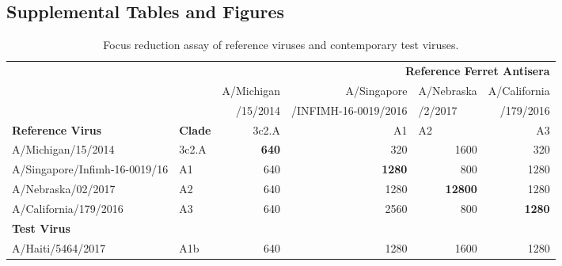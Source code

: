 \onecolumngrid
\setcounter{figure}{0}
\setcounter{table}{0}
\renewcommand{\thefigure}{S\arabic{figure}}
\renewcommand{\thetable}{S\Roman{table}}

\subsection*{Supplemental Tables and Figures}

\begin{table}[htbp]
  \centering
  \caption{Focus reduction assay of reference viruses and contemporary test viruses.}
    \begin{tabular}{|p{11em}|p{3em}|r|r|p{5em}|r|}
    \toprule
    \multicolumn{2}{c|}{\multirow{3}[3]{*}{}} & \multicolumn{4}{p{20em}|}{\textbf{Reference Ferret Antisera}} \\
\cmidrule{3-6}    \multicolumn{2}{c|}{} & \multicolumn{1}{p{5em}|}{A/Michigan} & \multicolumn{1}{p{5em}|}{A/Singapore} & A/Nebraska & \multicolumn{1}{p{5em}|}{A/California} \\
    \multicolumn{2}{c|}{} & \multicolumn{1}{p{5em}|}{/15/2014} & \multicolumn{1}{p{5em}|}{/INFIMH-16-0019/2016} & /2/2017 & \multicolumn{1}{p{5em}|}{/179/2016} \\
    \textbf{Reference Virus} & \textbf{Clade} & \multicolumn{1}{p{5em}|}{\cellcolor[rgb]{ .282,  .439,  .922}3c2.A} & \multicolumn{1}{p{5em}|}{\cellcolor[rgb]{ .459,  .776,  .663}A1} & \cellcolor[rgb]{ .996,  .733,  .263}A2 & \multicolumn{1}{p{5em}|}{\cellcolor[rgb]{ 1,  .412,  .2}A3} \\
    \midrule
    A/Michigan/15/2014 & \cellcolor[rgb]{ .282,  .439,  .922}3c2.A & \textbf{640} & 320   & \multicolumn{1}{r|}{1600} & 320 \\
    A/Singapore/Infimh-16-0019/16 & \cellcolor[rgb]{ .459,  .776,  .663}A1 & 640   & \textbf{1280} & \multicolumn{1}{r|}{800} & 1280 \\
    A/Nebraska/02/2017 & \cellcolor[rgb]{ .996,  .733,  .263}A2 & 640   & 1280  & \multicolumn{1}{r|}{\textbf{12800}} & 1280 \\
    \midrule
    A/California/179/2016 & \cellcolor[rgb]{ 1,  .412,  .2}A3 & 640   & 2560  & \multicolumn{1}{r|}{800} & \textbf{1280} \\
    \midrule
    \textbf{Test Virus} & \multicolumn{5}{c|}{} \\
    \midrule
    A/Haiti/5464/2017 & \cellcolor[rgb]{ .678,  .839,  .416}A1b & 640   & 1280  & \multicolumn{1}{r|}{1600} & 1280 \\

\end{tabular}
\end{table}
